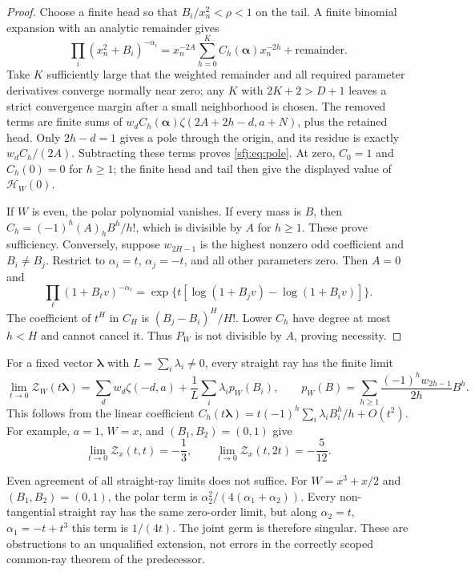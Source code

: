 \begin{proof}
Choose a finite head so that $B_i/x_n^2<\rho<1$ on the tail.  A
finite binomial expansion with an analytic remainder gives
\[
 \prod_i(x_n^2+B_i)^{-\alpha_i}
     =x_n^{-2A}\sum_{h=0}^{K}C_h(\boldsymbol\alpha)x_n^{-2h}
                      +\text{remainder}.
\]
Take $K$ sufficiently large that the weighted remainder and all
required parameter derivatives converge normally near zero; any
$K$ with $2K+2>D+1$ leaves a strict convergence margin after a
small neighborhood is chosen.  The removed terms are finite sums of
$w_dC_h(\boldsymbol\alpha)\zeta(2A+2h-d,a+N)$, plus the retained
head.  Only $2h-d=1$ gives a pole through the origin, and its
residue is exactly $w_dC_h/(2A)$.  Subtracting these terms proves
\eqref{sfj:eq:pole}.  At zero, $C_0=1$ and $C_h(0)=0$ for $h\ge1$;
the finite head and tail then give the displayed value of
$\mathscr H_W(0)$.

If $W$ is even, the polar polynomial vanishes.  If every mass is
$B$, then $C_h=(-1)^h(A)_hB^h/h!$, which is divisible by $A$ for
$h\ge1$.  These prove sufficiency.  Conversely, suppose $w_{2H-1}$
is the highest nonzero odd coefficient and $B_i\ne B_j$.  Restrict
to $\alpha_i=t$, $\alpha_j=-t$, and all other parameters zero.
Then $A=0$ and
\[
 \prod_\ell(1+B_\ell v)^{-\alpha_\ell}
  =\exp\{t[\log(1+B_jv)-\log(1+B_iv)]\}.
\]
The coefficient of $t^H$ in $C_H$ is
$(B_j-B_i)^H/H!$.  Lower $C_h$ have degree at most $h<H$ and
cannot cancel it.  Thus $P_W$ is not divisible by $A$, proving
necessity.
\end{proof}

For a fixed vector $\boldsymbol\lambda$ with
$L=\sum_i\lambda_i\ne0$, every straight ray has the finite limit
\begin{equation}\label{sfj:eq:direction-limit}
 \lim_{t\to0}\mathscr Z_W(t\boldsymbol\lambda)
 =\sum_dw_d\zeta(-d,a)+\frac1L\sum_i\lambda_i p_W(B_i),\qquad
 p_W(B)=\sum_{h\ge1}\frac{(-1)^hw_{2h-1}}{2h}B^h.
\end{equation}
This follows from the linear coefficient
$C_h(t\boldsymbol\lambda)=
t(-1)^h\sum_i\lambda_iB_i^h/h+O(t^2)$.
For example, $a=1$, $W=x$, and $(B_1,B_2)=(0,1)$ give
\begin{equation}\label{sfj:eq:direction-counterexample}
 \lim_{t\to0}\mathscr Z_x(t,t)=-\frac13,
 \qquad
 \lim_{t\to0}\mathscr Z_x(t,2t)=-\frac5{12}.
\end{equation}

Even agreement of all straight-ray limits does not suffice.  For
$W=x^3+x/2$ and $(B_1,B_2)=(0,1)$, the polar term is
$\alpha_2^2/(4(\alpha_1+\alpha_2))$.  Every non-tangential straight
ray has the same zero-order limit, but along
$\alpha_2=t$, $\alpha_1=-t+t^3$ this term is $1/(4t)$.
The joint germ is therefore singular.  These are obstructions to an
unqualified extension, not errors in the correctly scoped common-ray
theorem of the predecessor.

